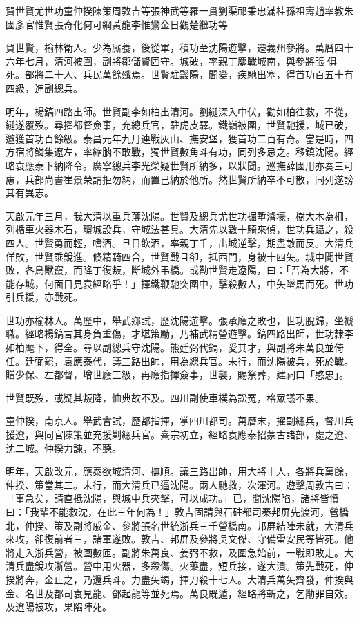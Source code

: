 
\begin{pinyinscope}
賀世賢尤世功童仲揆陳策周敦吉等張神武等羅一貫劉渠祁秉忠滿桂孫祖壽趙率教朱國彥官惟賢張奇化何可綱黃龍李惟鸞金日觀楚繼功等

賀世賢，榆林衛人。少為廝養，後從軍，積功至沈陽遊擊，遷義州參將。萬曆四十六年七月，清河被圍，副將鄒儲賢固守。城破，率親丁鏖戰城南，與參將張俱死。部將二十人、兵民萬餘殲焉。世賢駐靉陽，聞變，疾馳出塞，得首功百五十有四級，進副總兵。

明年，楊鎬四路出師。世賢副李如柏出清河。劉綎深入中伏，勸如柏往救，不從，綎遂覆歿。尋擢都督僉事，充總兵官，駐虎皮驛。鐵嶺被圍，世賢馳援，城已破，邀獲首功百餘級。泰昌元年九月連戰灰山、撫安堡，獲首功二百有奇。當是時，四方宿將鱗集遼左，率縮朒不敢戰，獨世賢數角斗有功，同列多忌之。移鎮沈陽。經略袁應泰下納降令。廣寧總兵李光榮疑世賢所納多，以狀聞。巡撫薛國用亦奏三可慮，兵部尚書崔景榮請拒勿納，而置己納於他所。然世賢所納卒不可散，同列遂謗其有異志。

天啟元年三月，我大清以重兵薄沈陽。世賢及總兵尤世功掘塹濬壕，樹大木為柵，列楯車火器木石，環城設兵，守城法甚具。大清先以數十騎來偵，世功兵躡之，殺四人。世賢勇而輕，嗜酒。旦日飲酒，率親丁千，出城逆擊，期盡敵而反。大清兵佯敗，世賢乘銳進。倏精騎四合，世賢戰且卻，抵西門，身被十四矢。城中聞世賢敗，各鳥獸竄，而降丁復叛，斷城外弔橋。或勸世賢走遼陽，曰：「吾為大將，不能存城，何面目見袁經略乎！」揮鐵鞭馳突圍中，擊殺數人，中矢墜馬而死。世功引兵援，亦戰死。

世功亦榆林人。萬歷中，舉武鄉試，歷沈陽遊擊。張承廕之敗也，世功脫歸，坐褫職。經略楊鎬言其身負重傷，才堪策勵，乃補武精營遊擊。鎬四路出師，世功隸李如柏麾下，得全。尋以副總兵守沈陽。熊廷弼代鎬，愛其才，與副將朱萬良並倚任。廷弼罷，袁應泰代，議三路出師，用為總兵官。未行，而沈陽被兵，死於戰。贈少保、左都督，增世廕三級，再廕指揮僉事，世襲，賜祭葬，建祠曰「愍忠」。

世賢既歿，或疑其叛降，恤典故不及。四川副使車樸為訟冤，格眾議不果。

童仲揆，南京人。舉武會試，歷都指揮，掌四川都司。萬曆末，擢副總兵，督川兵援遼，與同官陳策並充援剿總兵官。熹宗初立，經略袁應泰招蒙古諸部，處之遼、沈二城。仲揆力諫，不聽。

明年，天啟改元，應泰欲城清河、撫順。議三路出師，用大將十人，各將兵萬餘，仲揆、策當其二。未行，而大清兵已逼沈陽。兩人馳救，次渾河。遊擊周敦吉曰：「事急矣，請直抵沈陽，與城中兵夾擊，可以成功。」已，聞沈陽陷，諸將皆憤曰：「我輩不能救沈，在此三年何為！」敦吉固請與石砫都司秦邦屏先渡河，營橋北，仲揆、策及副將戚金、參將張名世統浙兵三千營橋南。邦屏結陣未就，大清兵來攻，卻復前者三，諸軍遂敗。敦吉、邦屏及參將吳文傑、守備雷安民等皆死。他將走入浙兵營，被圍數匝。副將朱萬良、姜弼不救，及圍急始前，一戰即敗走。大清兵盡銳攻浙營。營中用火器，多殺傷。火藥盡，短兵接，遂大潰。策先戰死，仲揆將奔，金止之，乃還兵斗。力盡矢竭，揮刀殺十七人。大清兵萬矢齊發，仲揆與金、名世及都司袁見龍、鄧起龍等並死焉。萬良既遁，經略將斬之，乞勩罪自效。及遼陽被攻，果陷陣死。


\end{pinyinscope}
